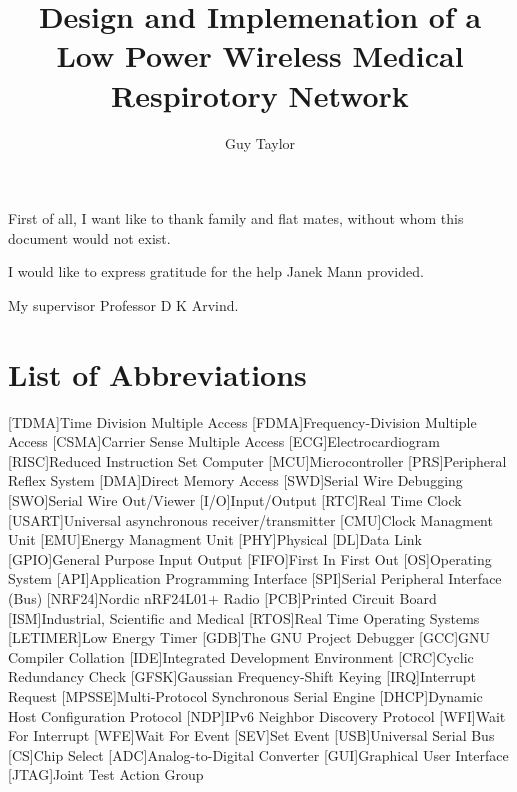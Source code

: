 \documentclass[bsc,logo,plainprepages,parskip,abbrevs,10pt]{infthesis}
\title{Design and Implemenation of a Low Power Wireless Medical Respirotory Network}
\author{Guy Taylor}
\newcommand{\listofabbreviations}{\chapter*{List of Abbreviations}}
\begin{document}
\begin{preliminary}

\maketitle

\begin{acknowledgements}
  First of all, I want like to thank family and flat mates, without whom this document would not exist.
  
  I would like to express gratitude for the help Janek Mann provided.
  
  My supervisor Professor D K Arvind.
\end{acknowledgements}

\standarddeclaration

\tableofcontents

\listoffigures
\listofabbreviations

\begin{acronym}
[TDMA]{Time Division Multiple Access}
[FDMA]{Frequency-Division Multiple Access}
[CSMA]{Carrier Sense Multiple Access}
[ECG]{Electrocardiogram}
[RISC]{Reduced Instruction Set Computer}
[MCU]{Microcontroller}
[PRS]{Peripheral Reflex System}
[DMA]{Direct Memory Access}
[SWD]{Serial Wire Debugging}
[SWO]{Serial Wire Out/Viewer}
[I/O]{Input/Output}
[RTC]{Real Time Clock}
[USART]{Universal asynchronous receiver/transmitter}
[CMU]{Clock Managment Unit}
[EMU]{Energy Managment Unit}
[PHY]{Physical}
[DL]{Data Link}
[GPIO]{General Purpose Input Output}
[FIFO]{First In First Out}
[OS]{Operating System}
[API]{Application Programming Interface}
[SPI]{Serial Peripheral Interface (Bus)}
[NRF24]{Nordic nRF24L01+ Radio}
[PCB]{Printed Circuit Board}
[ISM]{Industrial, Scientific and Medical}
[RTOS]{Real Time Operating Systems}
[LETIMER]{Low Energy Timer}
[GDB]{The GNU Project Debugger}
[GCC]{GNU Compiler Collation}
[IDE]{Integrated Development Environment}
[CRC]{Cyclic Redundancy Check}
[GFSK]{Gaussian Frequency-Shift Keying}
[IRQ]{Interrupt Request}
[MPSSE]{Multi-Protocol Synchronous Serial Engine}
[DHCP]{Dynamic Host Configuration Protocol}
[NDP]{IPv6 Neighbor Discovery Protocol}
[WFI]{Wait For Interrupt}
[WFE]{Wait For Event}
[SEV]{Set Event}
[USB]{Universal Serial Bus}
[CS]{Chip Select}
[ADC]{Analog-to-Digital Converter}
[GUI]{Graphical User Interface}
[JTAG]{Joint Test Action Group}
\end{acronym}

\end{preliminary}
\end{document}
